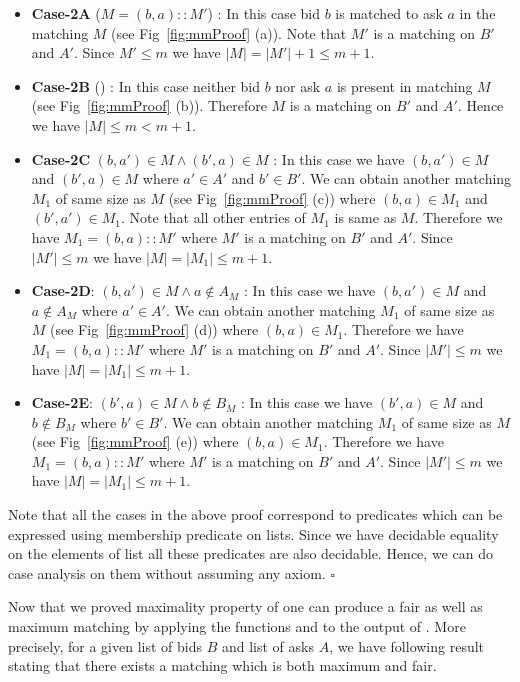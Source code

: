 \documentclass[a4paper,UKenglish,cleveref, autoref]{lipics-v2019}
\begin{document}
\begin{itemize}
\begin{itemize}
\item \textbf{Case-2A} ($M = (b,a)::M'$) : In this case  bid $b$ is matched to ask $a$ in the matching $M$ (see Fig~\ref{fig:mmProof} (a)). Note that $M'$ is a matching on $B'$ and $A'$. Since $M' \leq m$ we have $|M|= |M'|+1 \leq m+1$.
\item \textbf{Case-2B} () : In this case neither bid $b$ nor ask $a$ is present in matching $M$ (see Fig~\ref{fig:mmProof} (b)). Therefore $M$ is a matching on $B'$ and $A'$. Hence we have $|M| \leq m < m+1$.
\item \textbf{Case-2C} $(b,a') \in M \land (b',a) \in M$ : In this case we have $(b,a') \in M$ and  $(b',a) \in M$ where $a' \in A'$ and $b' \in B'$. We can obtain another matching $M_1$ of same size as $M$ (see Fig~\ref{fig:mmProof} (c)) where $(b,a) \in M_1$ and $(b',a') \in M_1$. Note that all other entries of $M_1$ is same as $M$. Therefore we have $M_1 = (b,a)::M'$ where $M'$ is a matching on $B'$ and $A'$. Since $|M'| \leq m$ we have $|M|=|M_1| \leq m+1$.
\item \textbf{Case-2D}: $(b,a')\in M \land a \notin A_M$ : In this case we have $(b,a')\in M$ and $a \notin A_M$ where $a'\in A'$. We can obtain another matching $M_1$ of same size as $M$ (see Fig~\ref{fig:mmProof} (d)) where $(b,a) \in M_1$. 
Therefore we have $M_1 = (b,a)::M'$ where $M'$ is a matching on $B'$ and $A'$.
Since $|M'| \leq m$ we have $|M|=|M_1| \leq m+1$.
\item \textbf{Case-2E}: $(b',a)\in M \land b \notin B_M$ : In this case we have $(b',a)\in M$ and $b \notin B_M$ where $b'\in B'$. We can obtain another matching $M_1$ of same size as $M$ (see Fig~\ref{fig:mmProof} (e)) where $(b,a) \in M_1$. 
Therefore we have $M_1 = (b,a)::M'$ where $M'$ is a matching on $B'$ and $A'$.
Since $|M'| \leq m$ we have $|M|=|M_1| \leq m+1$.
\end{itemize}
\end{itemize}
Note that all the cases in the above proof correspond to  predicates which can be expressed using  membership predicate on lists. Since we have  decidable equality on the elements of list all these predicates are also decidable. Hence, we can do case analysis on them without assuming any axiom. $\square$

Now that we  proved maximality property of   one can produce a fair as well as maximum matching by applying the functions   and  to the output of . More precisely, for a given list of bids $B$ and list of asks $A$, we have  following result stating that there exists a matching which is both maximum and fair. 
\end{document}
